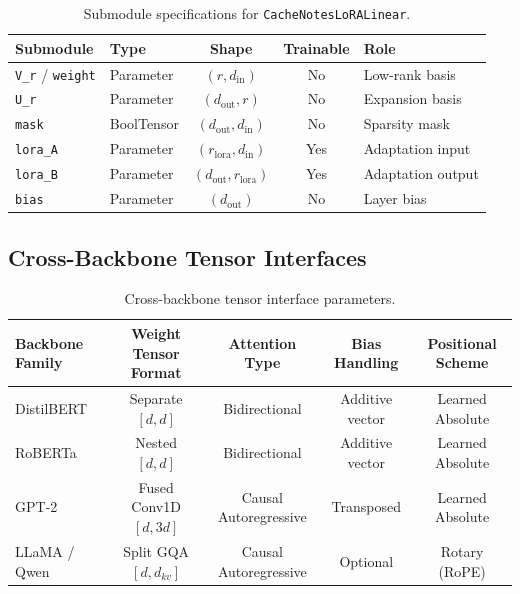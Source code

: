 \begin{table}[H]
\centering
\small
\begin{tabular}{llccp{5cm}}
\toprule
\textbf{Submodule} & \textbf{Type} & \textbf{Shape} & \textbf{Trainable} & \textbf{Role} \\
\midrule
\texttt{V\_r} / \texttt{weight} & Parameter & $(r, d_{\text{in}})$ & No & Low-rank basis \\
\texttt{U\_r} & Parameter & $(d_{\text{out}}, r)$ & No & Expansion basis \\
\texttt{mask} & BoolTensor & $(d_{\text{out}}, d_{\text{in}})$ & No & Sparsity mask \\
\texttt{lora\_A} & Parameter & $(r_{\text{lora}}, d_{\text{in}})$ & Yes & Adaptation input \\
\texttt{lora\_B} & Parameter & $(d_{\text{out}}, r_{\text{lora}})$ & Yes & Adaptation output \\
\texttt{bias} & Parameter & $(d_{\text{out}})$ & No & Layer bias \\
\bottomrule
\end{tabular}
\caption{Submodule specifications for \texttt{CacheNotesLoRALinear}.}
\label{tab:submodules_cachenotescompressor}
\end{table}

\subsection{Cross-Backbone Tensor Interfaces}
\begin{table}[H]
\centering
\small
\begin{tabular}{lcccc}
\toprule
\textbf{Backbone Family} & \textbf{Weight Tensor Format} & \textbf{Attention Type} & \textbf{Bias Handling} & \textbf{Positional Scheme} \\
\midrule
DistilBERT & Separate $[d, d]$ & Bidirectional & Additive vector & Learned Absolute \\
RoBERTa & Nested $[d, d]$ & Bidirectional & Additive vector & Learned Absolute \\
GPT-2 & Fused Conv1D $[d, 3d]$ & Causal Autoregressive & Transposed & Learned Absolute \\
LLaMA / Qwen & Split GQA $[d, d_{kv}]$ & Causal Autoregressive & Optional & Rotary (RoPE) \\
\bottomrule
\end{tabular}
\caption{Cross-backbone tensor interface parameters.}
\label{tab:backbone_interfaces}
\end{table}


